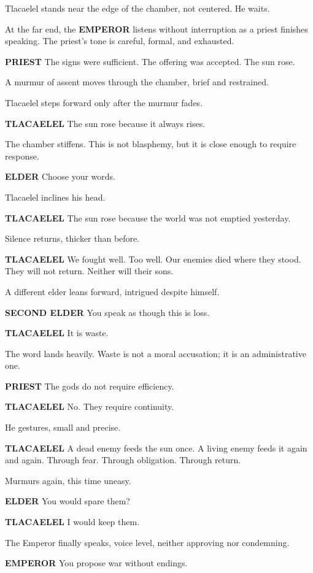 \documentclass[12pt]{article}
\begin{document}
Tlacaelel stands near the edge of the chamber, not centered. He waits.

At the far end, the \textbf{EMPEROR} listens without interruption as a priest finishes speaking. The priest’s tone is careful, formal, and exhausted.

\textbf{PRIEST}  
The signs were sufficient. The offering was accepted. The sun rose.

A murmur of assent moves through the chamber, brief and restrained.

Tlacaelel steps forward only after the murmur fades.

\textbf{TLACAELEL}  
The sun rose because it always rises.

The chamber stiffens. This is not blasphemy, but it is close enough to require response.

\textbf{ELDER}  
Choose your words.

Tlacaelel inclines his head.

\textbf{TLACAELEL}  
The sun rose because the world was not emptied yesterday.

Silence returns, thicker than before.

\textbf{TLACAELEL}  
We fought well. Too well. Our enemies died where they stood. They will not return. Neither will their sons.

A different elder leans forward, intrigued despite himself.

\textbf{SECOND ELDER}  
You speak as though this is loss.

\textbf{TLACAELEL}  
It is waste.

The word lands heavily. Waste is not a moral accusation; it is an administrative one.

\textbf{PRIEST}  
The gods do not require efficiency.

\textbf{TLACAELEL}  
No. They require continuity.

He gestures, small and precise.

\textbf{TLACAELEL}  
A dead enemy feeds the sun once. A living enemy feeds it again and again. Through fear. Through obligation. Through return.

Murmurs again, this time uneasy.

\textbf{ELDER}  
You would spare them?

\textbf{TLACAELEL}  
I would keep them.

The Emperor finally speaks, voice level, neither approving nor condemning.

\textbf{EMPEROR}  
You propose war without endings.
\end{document}
